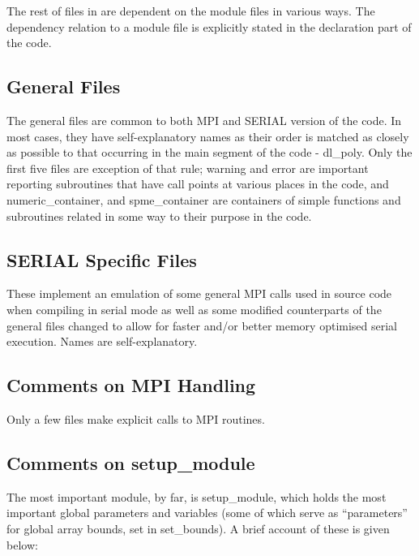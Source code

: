 The rest of files in \D are dependent on the module files in
various ways.  The dependency relation to a module file is
explicitly stated in the declaration part of the code.

\subsection{General Files}

The \D general files are common to both MPI and SERIAL version of
the code.  In most cases, they have self-explanatory names as their
order is matched as closely as possible to that occurring in the
main segment of the code - {\sc dl\_poly}.  Only the first five
files are exception of that rule; {\sc warning} and {\sc error} are
important reporting subroutines that have call points at various
places in the code, and {\sc numeric\_container}, and
{\sc spme\_container} are containers of simple functions and
subroutines related in some way to their purpose in the code.

\subsection{SERIAL Specific Files}

These implement an emulation of some general MPI calls used in \D
source code when compiling in serial mode as well as some modified
counterparts of the general files changed to allow for faster and/or
better memory optimised serial execution.  Names are
self-explanatory.

\subsection{Comments on MPI Handling}

Only a few files make explicit calls to MPI routines.

\subsection{Comments on {\sc setup\_module}}
\label{parameters}

The most important module, by far, is {\sc setup\_module}, which
holds the most important global parameters and variables (some of
which serve as ``parameters'' for global array bounds, set in {\sc
set\_bounds}). A brief account of these is given below:

